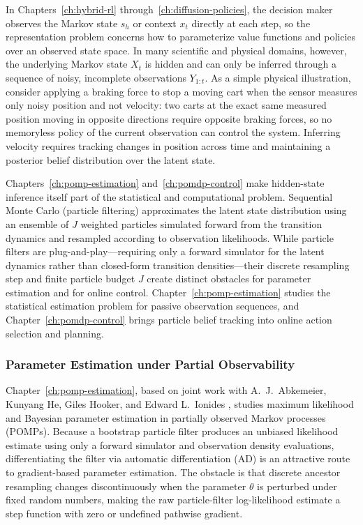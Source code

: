 \begin{aigenblock}
In Chapters~\ref{ch:hybrid-rl} through~\ref{ch:diffusion-policies}, the decision maker observes the Markov state $s_h$ or context $x_t$ directly at each step, so the representation problem concerns how to parameterize value functions and policies over an observed state space. In many scientific and physical domains, however, the underlying Markov state $X_t$ is hidden and can only be inferred through a sequence of noisy, incomplete observations $Y_{1:t}$. As a simple physical illustration, consider applying a braking force to stop a moving cart when the sensor measures only noisy position and not velocity: two carts at the exact same measured position moving in opposite directions require opposite braking forces, so no memoryless policy of the current observation can control the system. Inferring velocity requires tracking changes in position across time and maintaining a posterior belief distribution over the latent state.

Chapters~\ref{ch:pomp-estimation} and~\ref{ch:pomdp-control} make hidden-state inference itself part of the statistical and computational problem. Sequential Monte Carlo (particle filtering) approximates the latent state distribution using an ensemble of $J$ weighted particles simulated forward from the transition dynamics and resampled according to observation likelihoods. While particle filters are plug-and-play---requiring only a forward simulator for the latent dynamics rather than closed-form transition densities---their discrete resampling step and finite particle budget $J$ create distinct obstacles for parameter estimation and for online control. Chapter~\ref{ch:pomp-estimation} studies the statistical estimation problem for passive observation sequences, and Chapter~\ref{ch:pomdp-control} brings particle belief tracking into online action selection and planning.

\subsubsection{Parameter Estimation under Partial Observability}

Chapter~\ref{ch:pomp-estimation}, based on joint work with A.~J.~Abkemeier, Kunyang He, Giles Hooker, and Edward L.~Ionides \citep{tan2024accelerated}, studies maximum likelihood and Bayesian parameter estimation in partially observed Markov processes (POMPs). Because a bootstrap particle filter produces an unbiased likelihood estimate using only a forward simulator and observation density evaluations, differentiating the filter via automatic differentiation (AD) is an attractive route to gradient-based parameter estimation. The obstacle is that discrete ancestor resampling changes discontinuously when the parameter $\theta$ is perturbed under fixed random numbers, making the raw particle-filter log-likelihood estimate a step function with zero or undefined pathwise gradient.


\end{aigenblock}
